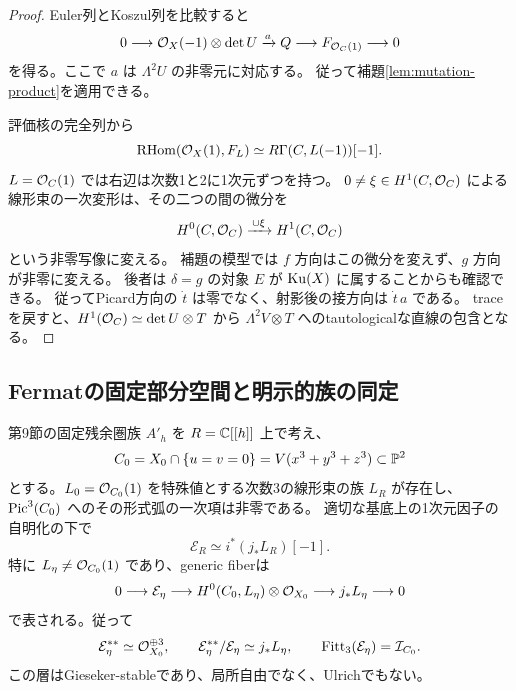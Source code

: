 \begin{proof}
Euler列とKoszul列を比較すると
\[
 0\longrightarrow\mathcal O_X(-1)\otimes\det U
   \xrightarrow{a}Q\longrightarrow F_{\mathcal O_C(1)}\longrightarrow0
\]
を得る。ここで $a$ は $\Lambda^2U$ の非零元に対応する。
従って補題\ref{lem:mutation-product}を適用できる。

評価核の完全列から
\[
 \operatorname{RHom}(\mathcal O_X(1),F_L)\simeq R\Gamma(C,L(-1))[-1].
\]
$L=\mathcal O_C(1)$ では右辺は次数1と2に1次元ずつを持つ。
$0\ne\xi\in H^1(C,\mathcal O_C)$ による線形束の一次変形は、その二つの間の微分を
\[
 H^0(C,\mathcal O_C)\xrightarrow{\,\cup\xi\,}H^1(C,\mathcal O_C)
\]
という非零写像に変える。
補題の模型では $f$ 方向はこの微分を変えず、$g$ 方向が非零に変える。
後者は $\delta=g$ の対象 $E$ が $\operatorname{Ku}(X)$ に属することからも確認できる。
従ってPicard方向の $\dot t$ は零でなく、射影後の接方向は $\dot t\,a$ である。
traceを戻すと、$H^1(\mathcal O_C)\simeq\det U\otimes T$ から
$\Lambda^2V\otimes T$ へのtautologicalな直線の包含となる。
\end{proof}

\subsection{Fermatの固定部分空間と明示的族の同定}

\begin{theorem}\label{thm:explicit-gluing-sheaf}
第9節の固定残余圏族 $A'_h$ を $R=\mathbb C[[h]]$ 上で考え、
\[
 C_0=X_0\cap\{u=v=0\}=V(x^3+y^3+z^3)\subset\mathbb P^2
\]
とする。$L_0=\mathcal O_{C_0}(1)$ を特殊値とする次数3の線形束の族 $L_R$ が存在し、
$\operatorname{Pic}^3(C_0)$ へのその形式弧の一次項は非零である。
適切な基底上の1次元因子の自明化の下で
\[
 \mathcal E_R\simeq i^*(j_*L_R)[-1].
\]
特に $L_\eta\ne\mathcal O_{C_0}(1)$ であり、generic fiberは
\begin{equation}\label{eq:explicit-gluing-evaluation}
 0\longrightarrow\mathcal E_\eta\longrightarrow
 H^0(C_0,L_\eta)\otimes\mathcal O_{X_0}
 \longrightarrow j_*L_\eta\longrightarrow0
\end{equation}
で表される。従って
\[
 \mathcal E_\eta^{**}\simeq\mathcal O_{X_0}^{\oplus3},\qquad
 \mathcal E_\eta^{**}/\mathcal E_\eta\simeq j_*L_\eta,
 \qquad\operatorname{Fitt}_3(\mathcal E_\eta)=\mathcal I_{C_0}.
\]
この層はGieseker-stableであり、局所自由でなく、Ulrichでもない。
\end{theorem}

